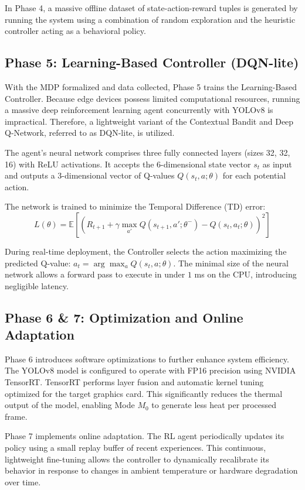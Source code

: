 \documentclass{ieeeaccess}
\begin{document}
In Phase 4, a massive offline dataset of state-action-reward tuples is generated by running the system using a combination of random exploration and the heuristic controller acting as a behavioral policy.

\subsection{Phase 5: Learning-Based Controller (DQN-lite)}
With the MDP formalized and data collected, Phase 5 trains the Learning-Based Controller. Because edge devices possess limited computational resources, running a massive deep reinforcement learning agent concurrently with YOLOv8 is impractical. Therefore, a lightweight variant of the Contextual Bandit and Deep Q-Network, referred to as DQN-lite, is utilized.

The agent's neural network comprises three fully connected layers (sizes 32, 32, 16) with ReLU activations. It accepts the 6-dimensional state vector $s_t$ as input and outputs a 3-dimensional vector of Q-values $Q(s_t, a; \theta)$ for each potential action.

The network is trained to minimize the Temporal Difference (TD) error:
\begin{equation}
L(\theta) = \mathbb{E} \left[ \left( R_{t+1} + \gamma \max_{a'} Q(s_{t+1}, a'; \theta^-) - Q(s_t, a_t; \theta) \right)^2 \right]
\end{equation}

During real-time deployment, the Controller selects the action maximizing the predicted Q-value: $a_t = \arg\max_{a} Q(s_t, a; \theta)$. The minimal size of the neural network allows a forward pass to execute in under $1$ ms on the CPU, introducing negligible latency.



\subsection{Phase 6 \& 7: Optimization and Online Adaptation}
Phase 6 introduces software optimizations to further enhance system efficiency. The YOLOv8 model is configured to operate with FP16 precision using NVIDIA TensorRT. TensorRT performs layer fusion and automatic kernel tuning optimized for the target graphics card. This significantly reduces the thermal output of the model, enabling Mode $M_0$ to generate less heat per processed frame.

Phase 7 implements online adaptation. The RL agent periodically updates its policy using a small replay buffer of recent experiences. This continuous, lightweight fine-tuning allows the controller to dynamically recalibrate its behavior in response to changes in ambient temperature or hardware degradation over time.
\end{document}
